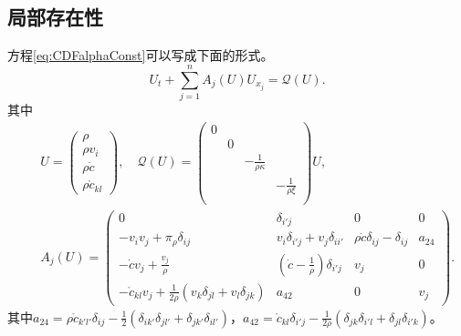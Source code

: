 	\subsection{局部存在性}
	方程\eqref{eq:CDFalphaConst}可以写成下面的形式。
	\begin{equation*}
		U_t + \sum_{j=1}^n A_j(U) U_{x_j} = \mathcal{Q}(U).
	\end{equation*}
	其中
	\begin{eqnarray*} 
		&& U =\left( \begin{array}{cccc} 
			\rho \\ \rho v_i \\ \rho \dot{c} \\ \rho \mathring{c}_{kl}
		\end{array}\right), \quad 
		\mathcal{Q}(U) = 
		\left( \begin{array}{cccc} 
			0 & & & \\
			& 0 & & \\
			& &  -\frac{1}{\rho \kappa} & \\
			& & & -\frac{1}{\rho\xi}  \\
 		\end{array}\right) U, \\%
	 		&&  A_{j}(U) =
 		\left( \begin{smallmatrix} 
 		0 & \delta_{i'j} & 0 & 0  \\
 		-v_i v_j  + \pi_\rho \delta_{ij} & v_i \delta_{i'j} + v_j \delta_{ii'}   &  \rho \dot{c} \delta_{ij} - \delta_{ij} & a_{24}  \\
 		-\dot{c} v_j + \frac{v_j}{\rho} & (\dot{c} - \frac{1}{\rho}) \delta_{i'j} &  v_j & 0 \\
 		-\mathring{c}_{kl} v_j + \frac{1}{2 \rho} (v_k \delta_{jl} + v_l \delta_{jk}) & a_{42} & 0 & v_j 
 		\end{smallmatrix} \right).
	\end{eqnarray*}
	其中$a_{24}=\rho \mathring{c}_{k'l'} \delta_{ij}- \frac{1}{2}(\delta_{ik'}\delta_{jl'} + \delta_{jk'}\delta_{il'})$，$a_{42} =  \mathring{c}_{kl} \delta_{i'j}  - \frac{1}{2\rho} (\delta_{jk} \delta_{i'l} +　\delta_{jl} \delta_{i'k})$。

